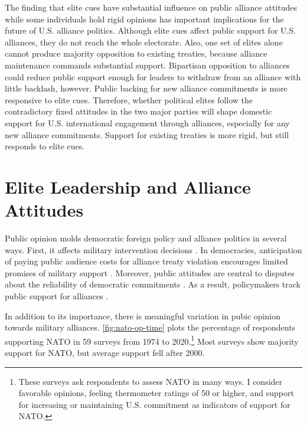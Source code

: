 \documentclass[12pt]{article}
\begin{document}
The finding that elite cues have substantial influence on public alliance attitudes while some individuals hold rigid opinions has important implications for the future of U.S. alliance politics. 
Although elite cues affect public support for U.S. alliances, they do not reach the whole electorate.
Also, one set of elites alone cannot produce majority opposition to existing treaties, because alliance maintenance commands substantial support.
Bipartisan opposition to alliances could reduce public support enough for leaders to withdraw from an alliance with little backlash, however.  
Public backing for new alliance commitments is more responsive to elite cues. 
Therefore, whether political elites follow the contradictory fixed attitudes in the two major parties will shape domestic support for U.S. international engagement through alliances, especially for any new alliance commitments.
Support for existing treaties is more rigid, but still responds to elite cues.



\section{Elite Leadership and Alliance Attitudes}


Public opinion molds democratic foreign policy and alliance politics in several ways.
First, it affects military intervention decisions \citep{Tomzetal2020, LinGreenberg2021}. 
In democracies, anticipation of paying public audience costs for alliance treaty violation encourages limited promises of military support \citep{Chibaetal2015, FjelstulReiter2019}. 
Moreover, public attitudes are central to disputes about the reliability of democratic commitments \citep{Gaubatz1996, GartzkeGleditsch2004}. 
As a result, policymakers track public support for alliances \citep{Sayle2019}. 


In addition to its importance, there is meaningful variation in pubic opinion towards military alliances. 
\autoref{fig:nato-op-time} plots the percentage of respondents supporting NATO in 59 surveys from 1974 to 2020.\footnote{These surveys ask respondents to assess NATO in many ways. I consider favorable opinions, feeling thermometer ratings of 50 or higher, and support for increasing or maintaining U.S. commitment as indicators of support for NATO.} 
Most surveys show majority support for NATO, but average support fell after 2000.  
\end{document}
